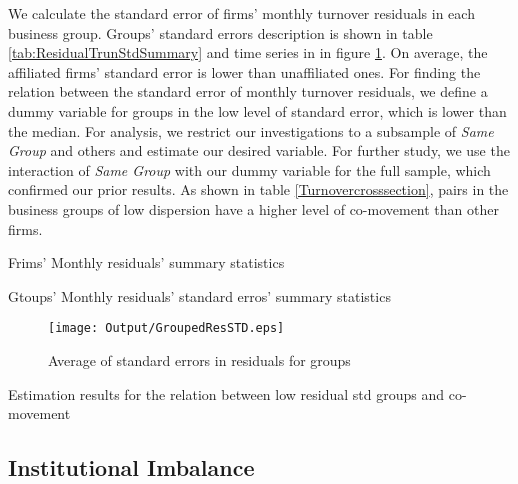 We calculate the standard error of firms' monthly turnover residuals in each business group. Groups' standard errors description is shown in table \ref{tab:ResidualTrunStdSummary} and time series in in figure \ref{fig:GroupedResSTD}. On average, the affiliated firms' standard error is lower than unaffiliated ones. For finding the relation between the standard error of monthly turnover residuals, we define a dummy variable for groups in the low level of standard error, which is lower than the median. For analysis, we restrict our investigations to a subsample of \textit{Same Group} and others and estimate our desired variable.   For further study, we use the interaction of \textit{Same Group} with our dummy variable for the full sample, which confirmed our prior results. As shown in table \ref{Turnovercrosssection}, pairs in the business groups of low dispersion have a higher level of co-movement than other firms.



{			\begin{table}[htbp]
	\centering
	\caption{Frims' Monthly residuals' summary statistics}
	\label{tab:ResidualTrunSummary}
	\resizebox{0.8\textwidth}{!}{
		
	}
\end{table}	
		\begin{table}[htbp]
			\centering
			\caption{Gtoups' Monthly residuals' standard erros' summary statistics}
			\label{tab:ResidualTrunStdSummary}
			\resizebox{0.8\textwidth}{!}{
				
			}
		\end{table}
\begin{figure}[htbp]
	\centering
	\texttt{[image: Output/GroupedResSTD.eps]}

	\caption{Average of standard errors in residuals for groups}
	\label{fig:GroupedResSTD}
\end{figure}
		\begin{table}[htbp]
			\centering
			\caption{Estimation results for the relation between low residual std groups and co-movement}
			\label{Turnovercrosssection}
			\resizebox{\textwidth}{!}{
				\centering
				
			}			
		\end{table}}




\FloatBarrier

%
%
\subsection{{Institutional Imbalance}}

